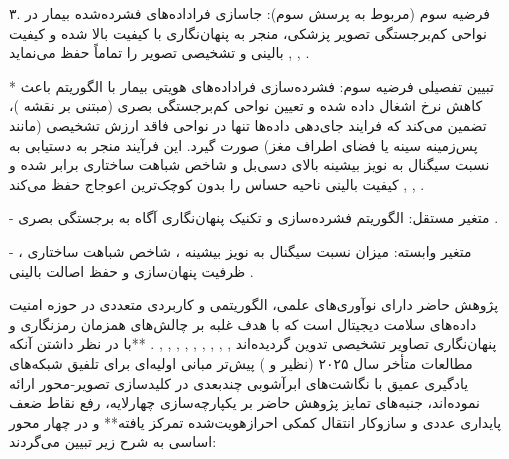 ۳. فرضیه سوم (مربوط به پرسش سوم): جاسازی فراداده‌های فشرده‌شده بیمار در نواحی کم‌برجستگی تصویر پزشکی، منجر به پنهان‌نگاری با کیفیت بالا  شده و کیفیت بالینی و تشخیصی تصویر را تماماً حفظ می‌نماید , , .\par

* تبیین تفصیلی فرضیه سوم: فشرده‌سازی فراداده‌های هویتی بیمار با الگوریتم  باعث کاهش نرخ اشغال داده شده و تعیین نواحی کم‌برجستگی بصری (مبتنی بر نقشه )، تضمین می‌کند که فرایند جای‌دهی داده‌ها تنها در نواحی فاقد ارزش تشخیصی (مانند پس‌زمینه سینه یا فضای اطراف مغز) صورت گیرد. این فرآیند منجر به دستیابی به نسبت سیگنال به نویز بیشینه  بالای  دسی‌بل و شاخص شباهت ساختاری  برابر  شده و کیفیت بالینی ناحیه حساس  را بدون کوچک‌ترین اعوجاج حفظ می‌کند , , .\par

  {-} متغیر مستقل: الگوریتم فشرده‌سازی  و تکنیک پنهان‌نگاری آگاه به برجستگی بصری .\par

  {-} متغیر وابسته: میزان نسبت سیگنال به نویز بیشینه ، شاخص شباهت ساختاری ، ظرفیت پنهان‌سازی و حفظ اصالت بالینی .\par





پژوهش حاضر دارای نوآوری‌های علمی، الگوریتمی و کاربردی متعددی در حوزه امنیت داده‌های سلامت دیجیتال است که با هدف غلبه بر چالش‌های همزمان رمزنگاری و پنهان‌نگاری تصاویر تشخیصی تدوین گردیده‌اند , , , , , , , , , . **با در نظر داشتن آنکه مطالعات متأخر سال ۲۰۲۵ (نظیر  و ) پیش‌تر مبانی اولیه‌ای برای تلفیق شبکه‌های یادگیری عمیق با نگاشت‌های ابرآشوبی چندبعدی در کلیدسازی تصویر‑محور ارائه نموده‌اند، جنبه‌های تمایز پژوهش حاضر بر یکپارچه‌سازی چهارلایه، رفع نقاط ضعف پایداری عددی و سازوکار انتقال کمکی احرازهویت‌شده تمرکز یافته** و در چهار محور اساسی به شرح زیر تبیین می‌گردند:\par

